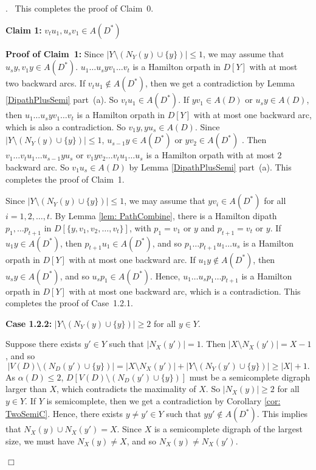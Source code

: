 \documentclass{article}
\newcommand{\2}{\vspace{2mm}}
\renewenvironment{proof}[1][]{\par \noindent {\bf Proof#1}.\ }{\hfill$\Box$
\par \vspace{11pt}}
\theoremstyle{definition}
\begin{document}
\begin{proof}
This completes the proof of Claim~0.
\2

{\bf Claim 1:} {\em $v_tu_1,u_sv_1 \in A(D^*)$}

\2

{\bf Proof of Claim~1:}
Since $|Y \setminus (N_Y(y) \cup \{y\})| \le 1$, we may assume that $u_sy,v_1y \in A(D^*)$.
$u_1\dots u_syv_1 \dots v_t$ is a Hamilton orpath in $D[Y]$ with at most two backward arcs. If $v_tu_1 \notin A(D^*)$, then we get a contradiction by Lemma \ref{DipathPlusSemi} part~(a). So $v_tu_1 \in A(D^*)$.
If $yv_1 \in A(D)$ or $u_sy \in A(D)$, then $u_1 \dots u_s y v_1 \dots v_t$ is a Hamilton orpath in $D[Y]$ with at most one backward arc, which is also a contradiction. So $v_1y, yu_s \in A(D)$.
Since $|Y \setminus (N_Y(y) \cup \{y\})| \le 1$, $u_{s-1} y \in A(D^*)$ or $yv_2 \in A(D^*)$ . Then $v_1 \dots v_t u_1 \dots u_{s-1} y u_s$ or $v_1 y v_2 \dots v_t u_1 \dots u_s$ is a Hamilton orpath with at most $2$ backward arc. So $v_1u_s \in A(D)$ by Lemma \ref{DipathPlusSemi} part~(a).
This completes the proof of Claim~1.

\2

Since $|Y \setminus (N_Y(y) \cup \{y\})| \le 1$, we may assume that $yv_i \in A(D^*)$ for all $i=1,2, \dots, t$. By Lemma \ref{lem: PathCombine}, there is a Hamilton dipath $p_1,\dots p_{t+1}$ in $D[\{y,v_1,v_2, \dots, v_t\}]$, with $p_1 = v_1$ or $y$ and $p_{t+1} = v_t$ or $y$. 
If $u_1y \in A(D^*)$, then $p_{t+1}u_1 \in A(D^*)$, and so $p_1 \dots p_{t+1}u_1 \dots u_s$ is a Hamilton orpath in $D[Y]$ with at most one backward arc. 
If $u_1y \notin A(D^*)$, then $u_sy \in A(D^*)$, and so $u_sp_1 \in A(D^*)$. Hence, $u_1 \dots u_sp_1 \dots p_{t+1}$ is a Hamilton orpath in $D[Y]$ with at most one backward arc, which is a contradiction. This completes the proof of Case~1.2.1.

\2

\textbf{Case 1.2.2:} $|Y \setminus (N_Y(y) \cup \{y\})| \ge 2$ for all $y \in Y$.

Suppose there exists $y' \in Y$ such that $|N_X(y')|=1$. Then $|X \setminus N_X(y')| = X-1$, and so
\[
|V(D) \setminus (N_D(y')\cup \{y\})|=|X \setminus N_X(y')|+|Y \setminus (N_Y(y')\cup \{y\})|\ge |X|+1.
\]
As $\alpha(D) \le 2$, $D[V(D) \setminus (N_D(y')\cup \{y\})]$ must be a semicomplete digraph larger than $X$, which contradicts the maximality of $X$.
So $|N_X(y)| \ge 2$ for all $y \in Y$. If $Y$ is semicomplete, then we get a contradiction by Corollary \ref{cor: TwoSemiC}. Hence, there exists $y\neq y' \in Y$ such that $yy' \notin A(D^*)$. This implies that $N_X(y) \cup N_X(y') = X $. Since $X$ is a semicomplete digraph of the largest size, we must have $N_X(y) \neq X$, and so $N_X(y) \neq N_X(y')$. 


\end{proof}
\end{document}
